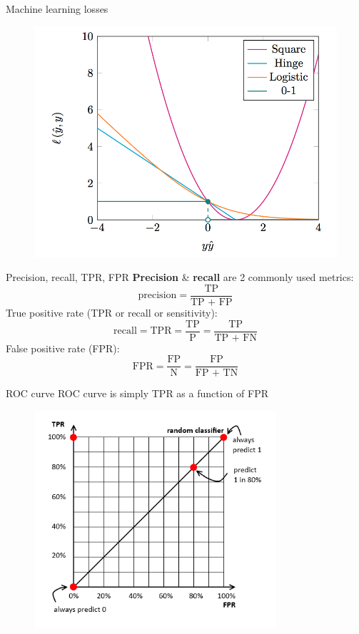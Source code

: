 \documentclass{beamer}
\newcommand{\1}[1]{\mathbbm{1}\left[#1\right]}
\begin{document}
\begin{frame}{Machine learning losses}
\begin{figure}
\centering
\includegraphics[width=\textwidth]{images/losses.png}
\end{figure}
\end{frame}

\begin{frame}{Precision, recall, TPR, FPR}
\textbf{Precision} \& \textbf{recall} are 2 commonly used metrics: 
\vfill
\pause
$$ \text{precision} = \dfrac{\text{TP}}{\text{TP + FP}} $$
\vfill
\pause
True positive rate (TPR or recall or sensitivity):
$$ \text{recall} = \text{TPR} = \dfrac{\text{TP}}{\text{P}} = \dfrac{\text{TP}}{\text{TP + FN}} $$
\vfill
\pause
False positive rate (FPR):
$$ \text{FPR} = \dfrac{\text{FP}}{\text{N}} = \dfrac{\text{FP}}{\text{FP + TN}} $$
\end{frame}

\begin{frame}{ROC curve}
ROC curve is simply TPR as a function of FPR
\vfill
\pause
\begin{figure}
\centering
\includegraphics[width=0.8\textwidth]{images/example_roc.png}
\end{figure}
\end{frame}
\end{document}

